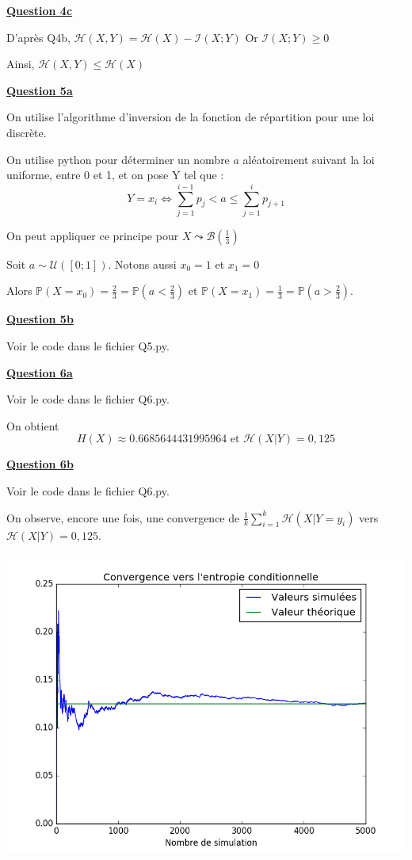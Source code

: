 \documentclass[a4paper,twoside,10pt]{article}
\renewcommand{\H}{\mathcal{H}}
\newcommand{\I}{\mathcal{I}}
\newcommand{\B}{\mathcal{B}}
\newenvironment{Q}[1]{%
\vspace{1ex}
\underline{\textbf{Question #1\\}}
\newline
}{
\vspace{2ex}
}
\begin{document}
\begin{Q}{4c}

D'après Q4b, $\H(X,Y) = \H(X) - \I(X;Y)$ Or $\I(X;Y) \geq 0$

Ainsi, $\H(X,Y) \leq \H(X)$
\end{Q}

\begin{Q}{5a}

On utilise l'algorithme d'inversion de la fonction de répartition pour une loi discrète.

On utilise python pour déterminer un nombre $a$ aléatoirement suivant la loi uniforme, entre 0 et 1, et on pose Y tel que : 
\[
Y = x_i  \iff \sum_{j = 1}^{i-1} p_j < a \leq \sum_{j = 1}^{i} p_{j+1}
\]

On peut appliquer ce principe pour $X \leadsto \B(\frac{1}{3})$

Soit $a \sim \mathcal{U}([0;1])$. Notons aussi $x_0 = 1$ et $x_1 = 0$

Alors $\mathbb{P}(X = x_0) = \frac{2}{3} = \mathbb{P}(a < \frac{2}{3})$ et 
$\mathbb{P}(X = x_1) = \frac{1}{3} = \mathbb{P}(a > \frac{2}{3})$.
\end{Q}

\begin{Q}{5b}
Voir le code dans le fichier Q5.py.
\end{Q}

\begin{Q}{6a}
Voir le code dans le fichier Q6.py.

On obtient \[H(X) \approx 0.6685644431995964 \text{ et } \H(X|Y) = 0,125\]
\end{Q}

\begin{Q}{6b}
Voir le code dans le fichier Q6.py.

On observe, encore une fois, une convergence de $\frac{1}{k} \sum_{i = 1}^{k} \H(X|Y = y_i)$ vers $\H(X|Y) = 0,125$.

\begin{center}
\includegraphics[width=\textwidth]{Q6b.png}
\end{center}

\end{Q}
\end{document}
